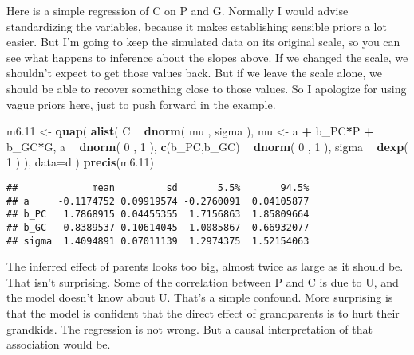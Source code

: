 \documentclass[
]{article}
\newenvironment{Shaded}{\begin{snugshade}}{\end{snugshade}}
\newcommand{\DataTypeTok}[1]{\textcolor[rgb]{0.13,0.29,0.53}{#1}}
\newcommand{\DecValTok}[1]{\textcolor[rgb]{0.00,0.00,0.81}{#1}}
\newcommand{\FloatTok}[1]{\textcolor[rgb]{0.00,0.00,0.81}{#1}}
\newcommand{\KeywordTok}[1]{\textcolor[rgb]{0.13,0.29,0.53}{\textbf{#1}}}
\newcommand{\NormalTok}[1]{#1}
\newcommand{\OperatorTok}[1]{\textcolor[rgb]{0.81,0.36,0.00}{\textbf{#1}}}
\newcommand{\StringTok}[1]{\textcolor[rgb]{0.31,0.60,0.02}{#1}}
\begin{document}
Here is a simple regression of C on P and G. Normally I would advise
standardizing the variables, because it makes establishing sensible
priors a lot easier. But I'm going to keep the simulated data on its
original scale, so you can see what happens to inference about the
slopes above. If we changed the scale, we shouldn't expect to get those
values back. But if we leave the scale alone, we should be able to
recover something close to those values. So I apologize for using vague
priors here, just to push forward in the example.

\begin{Shaded}
\begin{Highlighting}[]
\NormalTok{m6}\FloatTok{.11}\NormalTok{ <-}\StringTok{ }\KeywordTok{quap}\NormalTok{( }\KeywordTok{alist}\NormalTok{(}
\NormalTok{C }\OperatorTok{~}\StringTok{ }\KeywordTok{dnorm}\NormalTok{( mu , sigma ),}
\NormalTok{mu <-}\StringTok{ }\NormalTok{a }\OperatorTok{+}\StringTok{ }\NormalTok{b_PC}\OperatorTok{*}\NormalTok{P }\OperatorTok{+}\StringTok{ }\NormalTok{b_GC}\OperatorTok{*}\NormalTok{G,}
\NormalTok{a }\OperatorTok{~}\StringTok{ }\KeywordTok{dnorm}\NormalTok{( }\DecValTok{0}\NormalTok{ , }\DecValTok{1}\NormalTok{ ), }
\KeywordTok{c}\NormalTok{(b_PC,b_GC) }\OperatorTok{~}\StringTok{ }\KeywordTok{dnorm}\NormalTok{( }\DecValTok{0}\NormalTok{ , }\DecValTok{1}\NormalTok{ ), }
\NormalTok{sigma }\OperatorTok{~}\StringTok{ }\KeywordTok{dexp}\NormalTok{( }\DecValTok{1}\NormalTok{ )}
\NormalTok{), }\DataTypeTok{data=}\NormalTok{d ) }
\KeywordTok{precis}\NormalTok{(m6}\FloatTok{.11}\NormalTok{)}
\end{Highlighting}
\end{Shaded}

\begin{verbatim}
##             mean         sd       5.5%       94.5%
## a     -0.1174752 0.09919574 -0.2760091  0.04105877
## b_PC   1.7868915 0.04455355  1.7156863  1.85809664
## b_GC  -0.8389537 0.10614045 -1.0085867 -0.66932077
## sigma  1.4094891 0.07011139  1.2974375  1.52154063
\end{verbatim}

The inferred effect of parents looks too big, almost twice as large as
it should be. That isn't surprising. Some of the correlation between P
and C is due to U, and the model doesn't know about U. That's a simple
confound. More surprising is that the model is confident that the direct
effect of grandparents is to hurt their grandkids. The regression is not
wrong. But a causal interpretation of that association would be.
\end{document}

